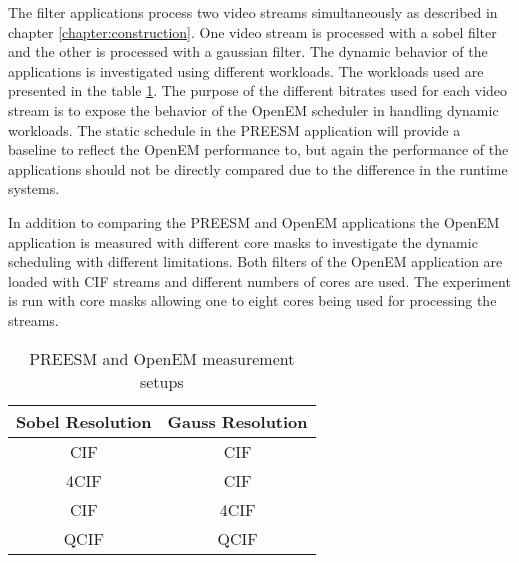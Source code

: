 The filter applications process two video streams simultaneously as described in chapter \ref{chapter:construction}. One video stream is processed with a sobel filter and the other is processed with a gaussian filter. The dynamic behavior of the applications is investigated using different workloads. The workloads used are presented in the table \ref{tab:preesm_setups}. The purpose of the different bitrates used for each video stream is to expose the behavior of the OpenEM scheduler in handling dynamic workloads. The static schedule in the PREESM application will provide a baseline to reflect the OpenEM performance to, but again the performance of the applications should not be directly compared due to the difference in the runtime systems.

In addition to comparing the PREESM and OpenEM applications the OpenEM application is measured with different core masks to investigate the dynamic scheduling with different limitations. Both filters of the OpenEM application are loaded with CIF streams and different numbers of cores are used. The experiment is run with core masks allowing one to eight cores being used for processing the streams.


\begin{table}
    \begin{center}
        \begin{tabular}{ c c }
            Sobel Resolution & Gauss Resolution \\ \hline
            CIF              & CIF              \\ \hline
            4CIF             & CIF              \\ \hline
            CIF              & 4CIF             \\ \hline
            QCIF             & QCIF             \\ \hline
        \end{tabular}
        \caption{PREESM and OpenEM measurement setups}
        \label{tab:preesm_setups}
    \end{center}
\end{table}
